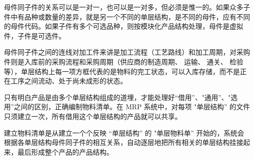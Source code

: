     母件同子件的关系可以是一对一，也可以是一对多，但必须是惟一的。如果众多子件中有品种或数量的差异，就是另一个不同的单层结构，是不同的母件，应有不同的母件代码。如果子件有多个可选品种，则按模块化产品结构处理，母件是虚拟件，子件是可选件。

    母件同子件之间的连线对加工件来讲是加工流程（工艺路线）和加工周期，对采购件则是入库前的采购流程和采购周期（供应商的制造周期、 运输、 通关、 检验等），单层结构上每一项方框代表的是物料的完工状态，可以入库存储，而不是正在工序之间流动、处于尚未成形的状态。

    只有明白产品是由多个单层结构组成的道埋，才能处理好“借用”、"通用”、"选用”之间的区别，正确编制物料清单。在 MRP 系统中，对每项 "单层结构” 的文件只须建立一次，所有借用这个单层结构的产品就可以共享。

    建立物料清单是从建立一个个反映 “单层结构” 的 "单层物料单” 开始的，系统会根据各单层结构母件同子件的相互关系，自动逐层地把所有相关的单层结构挂接起来，最后形成整个产品的产品结构。
